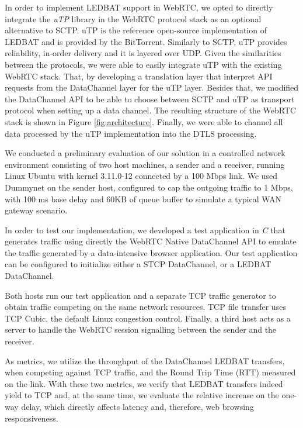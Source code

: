 \documentclass{sig-alternate}
\begin{document}
In order to implement LEDBAT support in WebRTC, we opted to directly integrate the
\textit{uTP} library \cite{utp-repo} in the WebRTC protocol stack as an optional
alternative to SCTP. uTP is the reference open-source implementation of LEDBAT and is
provided by the BitTorrent. Similarly to SCTP, uTP provides reliability, in-order delivery
and it is layered over UDP. Given the similarities between the protocols, we were able to
easily integrate uTP with the existing WebRTC stack. That, by developing a translation
layer that interpret API requests from the DataChannel layer for the uTP layer. Besides
that, we modified the DataChannel API to be able to choose between SCTP and uTP as
transport protocol when setting up a data channel. The resulting structure of the WebRTC
stack is shown in Figure \ref{fig:architecture}. Finally, we were able to channel all data
processed by the uTP implementation into the DTLS processing.


\label{sec:architecture}


We conducted a preliminary evaluation of our solution in a controlled network environment
consisting of two host machines, a sender and a receiver, running Linux Ubuntu with kernel
3.11.0-12 connected by a 100 Mbps link. We used Dummynet on the sender host,
configured to cap the outgoing traffic to 1 Mbps, with 100 ms base delay and 60KB of queue
buffer to simulate a typical WAN gateway scenario. 

In order to test our implementation, we developed a test application in \textit{C} that
generates traffic using directly the WebRTC Native DataChannel API to emulate the traffic
generated by a data-intensive browser application. Our test application can be configured
to initialize either a STCP DataChannel, or a LEDBAT DataChannel.

Both hosts run our test application and a separate TCP traffic generator to obtain traffic
competing on the same network resources. TCP file transfer uses TCP Cubic, the default
Linux congestion control. Finally, a third host acts as a server to handle the WebRTC
session signalling between the sender and the receiver.

As metrics, we utilize the throughput of the DataChannel LEDBAT transfers, when competing
against TCP traffic, and the Round Trip Time (RTT) measured on the link. With these two
metrics, we verify that LEDBAT transfers indeed yield to TCP and, at the same time, we
evaluate the relative increase on the one-way delay, which directly affects latency and,
therefore, web browsing responsiveness.
\end{document}
